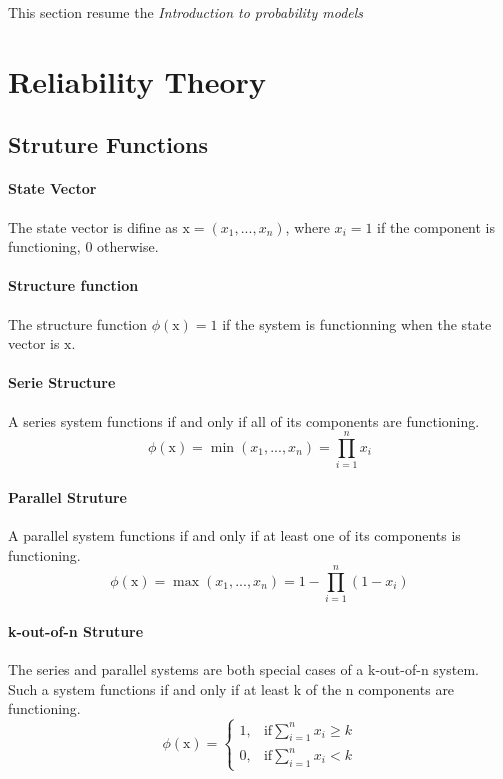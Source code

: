 
{ \color{red} This section resume the \emph{Introduction to probability models} }

\section{Reliability Theory}

\subsection{Struture Functions}

\paragraph{State Vector}
The state vector is difine as $\mathrm{x} = (x_1,...,x_n)$, where $x_i = 1$ if the component is functioning, 0 otherwise.

\paragraph{Structure function}
The structure function $\phi(\mathrm{x}) = 1$ if the system is functionning when the state vector is $\mathrm{x}$.

\paragraph{Serie Structure}
A series system functions if and only if all of its components are functioning.
\[ \phi(\mathrm{x}) = \min(x_1,...,x_n) = \prod_{i=1}^n x_i \]

\paragraph{Parallel Struture}
A parallel system functions if and only if at least one of its components is functioning. 
\[ \phi(\mathrm{x}) = \max(x_1,...,x_n) = 1 - \prod_{i=1}^n (1 - x_i) \]

\paragraph{k-out-of-n Struture}
The series and parallel systems are both special cases of a k-out-of-n system. Such a system functions if and only if at least k of the n components are functioning. 
\[ \phi(\mathrm{x}) = \left\{
\begin{array}{lr}
    1, & \text{if} \sum_{i=1}^n x_i \geq k \\
    0, & \text{if} \sum_{i=1}^n x_i < k
\end{array} \right. \]


